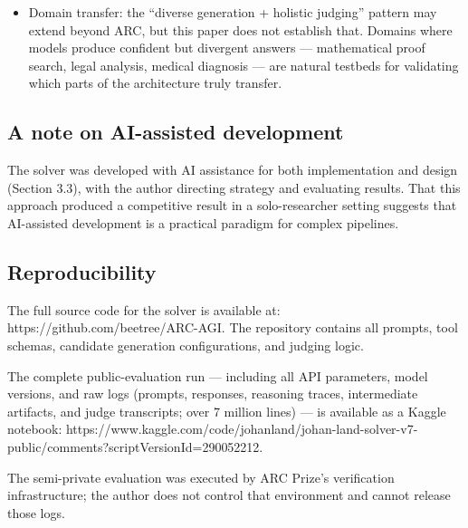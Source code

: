 \documentclass[11pt]{article}
\begin{document}
\begin{itemize}
  information-theoretic metrics over the candidate distribution ---
  would enable principled decisions about which generators to add,
  remove, or scale. A task-archetype taxonomy (classifying ARC tasks by
  the type of reasoning they require) could further clarify which
  modalities are most valuable for which problem classes.
\item
  Domain transfer: the ``diverse generation + holistic judging'' pattern
  may extend beyond ARC, but this paper does not establish that. Domains
  where models produce confident but divergent answers --- mathematical
  proof search, legal analysis, medical diagnosis --- are natural
  testbeds for validating which parts of the architecture truly
  transfer.
\end{itemize}

\hypertarget{a-note-on-ai-assisted-development}{%
\subsection{A note on AI-assisted
development}\label{a-note-on-ai-assisted-development}}

The solver was developed with AI assistance for both implementation and
design (Section 3.3), with the author directing strategy and evaluating
results. That this approach produced a competitive result in a
solo-researcher setting suggests that AI-assisted development is a
practical paradigm for complex pipelines.

\hypertarget{reproducibility}{%
\subsection{Reproducibility}\label{reproducibility}}

The full source code for the solver is available at:
https://github.com/beetree/ARC-AGI. The repository contains all prompts,
tool schemas, candidate generation configurations, and judging logic.

The complete public-evaluation run --- including all API parameters,
model versions, and raw logs (prompts, responses, reasoning traces,
intermediate artifacts, and judge transcripts; over 7 million lines) ---
is available as a Kaggle notebook:
https://www.kaggle.com/code/johanland/johan-land-solver-v7-public/comments?scriptVersionId=290052212.

The semi-private evaluation was executed by ARC Prize's verification
infrastructure; the author does not control that environment and cannot
release those logs.
\end{document}
